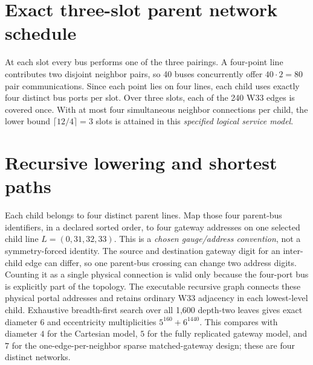 \documentclass[10pt]{article}
\begin{document}
\section{Exact three-slot parent network schedule}
At each slot every bus performs one of the three pairings.
A four-point line contributes two disjoint neighbor pairs,
so 40 buses concurrently offer $40\cdot2=80$ pair
communications. Since each point lies on four lines, each
child uses exactly four distinct bus ports per slot.
Over three slots, each of the 240 W33 edges is covered
once. With at most four simultaneous neighbor connections
per child, the lower bound $\lceil12/4\rceil=3$ slots is
attained in this \emph{specified logical service model}.

\section{Recursive lowering and shortest paths}
Each child belongs to four distinct parent lines.
Map those four parent-bus identifiers, in a declared
sorted order, to four gateway addresses on one selected
child line $L=(0,31,32,33)$. This is a \emph{chosen
gauge/address convention}, not a symmetry-forced identity.
The source and destination gateway digit for an inter-child
edge can differ, so one parent-bus crossing can change
two address digits. Counting it as a single physical
connection is valid only because the four-port bus
is explicitly part of the topology.
The executable recursive graph connects these physical
portal addresses and retains ordinary W33 adjacency in
each lowest-level child.
Exhaustive breadth-first search over all 1,600 depth-two
leaves gives exact diameter $6$ and eccentricity
multiplicities $5^{160}+6^{1440}$.
This compares with diameter $4$ for the Cartesian
model, $5$ for the fully replicated gateway model,
and $7$ for the one-edge-per-neighbor sparse
matched-gateway design; these are four distinct networks.
\end{document}
